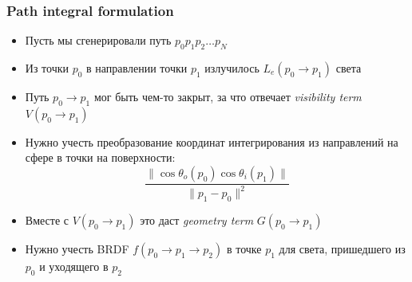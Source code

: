 \documentclass[10pt]{beamer}
\begin{document}
\begin{frame}
\frametitle{Path integral formulation}
\begin{itemize}
\item Пусть мы сгенерировали путь \begin{math}p_0 p_1 p_2 \dots p_N\end{math}
\pause
\item Из точки \begin{math}p_0\end{math} в направлении точки \begin{math}p_1\end{math} излучилось \begin{math}L_e(p_0 \rightarrow p_1)\end{math} света
\pause
\item Путь \begin{math}p_0 \rightarrow p_1\end{math} мог быть чем-то закрыт, за что отвечает \textit{visibility term} \begin{math}V(p_0\rightarrow p_1)\end{math}
\pause
\item Нужно учесть преобразование координат интегрирования из направлений на сфере в точки на поверхности: \begin{equation*}\frac{\|\cos \theta_o(p_0) \cos\theta_i(p_1)\|}{\|p_1 - p_0\|^2}\end{equation*}
\pause
\item Вместе с \begin{math}V(p_0\rightarrow p_1)\end{math} это даст \textit{geometry term} \begin{math}G(p_0\rightarrow p_1)\end{math}
\pause
\item Нужно учесть BRDF \begin{math}f(p_0\rightarrow p_1 \rightarrow p_2)\end{math} в точке \begin{math}p_1\end{math} для света, пришедшего из \begin{math}p_0\end{math} и уходящего в \begin{math}p_2\end{math}
\end{itemize}
\end{frame}
\end{document}
